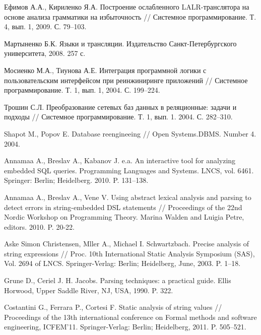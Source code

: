 \documentclass{llncs}
\begin{document}






%
%
\begin{thebibliography}{}
  
Ефимов А.А., Кириленко Я.А. Построение ослабленного LALR-транслятора на основе анализа грамматики на избыточность // Системное программирование. Т. 4, вып. 1, 2009. С. 79–103.  

Мартыненко Б.К. Языки и трансляции. Издательство Санкт-Петербургского университета, 2008. 257 с. 

Мосиенко М.А., Тиунова А.Е. Интеграция программной логики с пользовательским интерфейсом при реинжиниринге приложений // Системное программирование. Т. 1, вып. 1, 2004. С. 199–224.

Трошин С.Л. Преобразование сетевых баз данных в реляционные: задачи и подходы // Системное программирование. Т. 1, вып. 1. 2004. С. 282–310.

Shapot M., Popov E. Database reengineeing // Open Systems.DBMS. Number 4. 2004.    

Annamaa A., Breslav A., Kabanov J. e.a. An interactive tool for analyzing embedded SQL queries. Programming Languages and Systems. LNCS, vol. 6461. Springer: Berlin; Heidelberg. 2010. P. 131–138.

Annamaa A., Breslav A., Vene V. Using abstract lexical analysis and parsing to detect errors in string-embedded DSL statements // Proceedings of the 22nd Nordic Workshop on Programming Theory. Marina Walden and Luigia Petre, editors. 2010. P. 20-22.

Aske Simon Christensen, Mller A., Michael I. Schwartzbach. Precise analysis of string expressions // Proc. 10th International Static Analysis Symposium (SAS), Vol. 2694 of LNCS. Springer-Verlag: Berlin; Heidelberg, June, 2003. P. 1–18.

Grune D., Ceriel J. H. Jacobs. Parsing techniques: a practical guide. Ellis Horwood, Upper Saddle River, NJ, USA, 1990. P. 322.

Costantini G., Ferrara P., Cortesi F. Static analysis of string values // Proceedings of the 13th international conference on Formal methods and software engineering, ICFEM’11. Springer-Verlag: Berlin; Heidelberg, 2011. P. 505–521.


\end{thebibliography}
\end{document}
